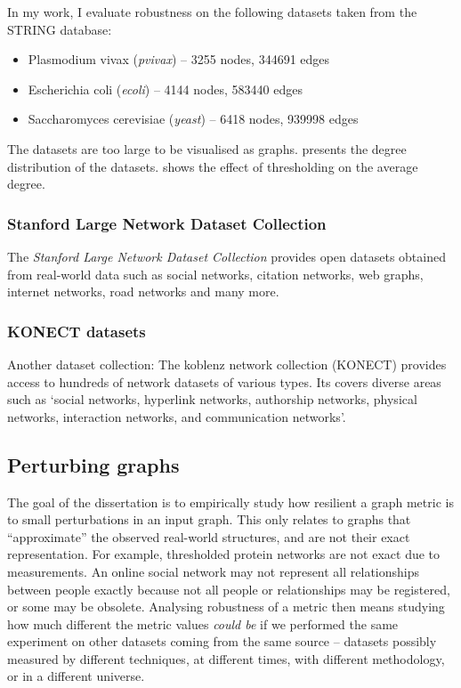 In my work, I evaluate robustness on the following datasets taken from the STRING database:
\begin{itemize}
    \item Plasmodium vivax (\textsl{pvivax}) -- 3255 nodes, 344691 edges
    \item Escherichia coli (\textsl{ecoli}) -- 4144 nodes, 583440 edges
    \item Saccharomyces cerevisiae (\textsl{yeast}) -- 6418 nodes, 939998 edges
\end{itemize}

The datasets are too large to be visualised as graphs.
 presents the degree distribution of the datasets.
 shows the effect of thresholding on the average degree.

\subsubsection{Stanford Large Network Dataset Collection}

The \textit{Stanford Large Network Dataset Collection}\cite{Large2016} provides open datasets obtained from real-world data such as social networks, citation networks, web graphs, internet networks, road networks and many more.


\subsubsection{KONECT datasets}

Another dataset collection: The koblenz network collection (KONECT)\cite{Kunegis2013} provides access to hundreds of network datasets of various types.
Its covers diverse areas such as `social networks, hyperlink networks, authorship networks, physical networks, interaction networks, and communication networks'.


\subsection{Perturbing graphs}

The goal of the dissertation is to empirically study how resilient a graph metric is to small perturbations in an input graph.
This only relates to graphs that ``approximate'' the observed real-world structures, and are not their exact representation.
For example, thresholded protein networks are not exact due to measurements.
An online social network may not represent all relationships between people exactly because not all people or relationships may be registered, or some may be obsolete.
Analysing robustness of a metric then means studying how much different the metric values \textsl{could be} if we performed the same experiment on other datasets coming from the same source -- datasets possibly measured by different techniques, at different times, with different methodology, or in a different universe.

